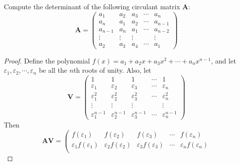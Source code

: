 \documentclass[12pt, a4paper, oneside]{book}
\begin{document}
\begin{question}
    Compute the determinant of the following circulant matrix $\mathbf{A}$:
    \[
        \mathbf{A}
        =
        \left(\begin{array}{ccccc}
                a_1     & a_2    & a_3    & \cdots & a_n     \\
                a_n     & a_1    & a_2    & \cdots & a_{n-1} \\
                a_{n-1} & a_n    & a_1    & \cdots & a_{n-2} \\
                \vdots  & \vdots & \vdots &        & \vdots  \\
                a_2     & a_3    & a_4    & \cdots & a_1
            \end{array}\right)
    \]
    \begin{proof}
        Define the polynomial $f(x)=a_1+a_2 x+a_3 x^2+\cdots+a_n x^{n-1}$, and let $\varepsilon_1, \varepsilon_2, \cdots, \varepsilon_n$ be all the $n$th roots of unity. Also, let
        \[
            \mathbf{V}
            =
            \left(\begin{array}{ccccc}
                    1                   & 1                   & 1                   & \cdots & 1                   \\
                    \varepsilon_1       & \varepsilon_2       & \varepsilon_3       & \cdots & \varepsilon_n       \\
                    \varepsilon_1^2     & \varepsilon_2^2     & \varepsilon_3^2     & \cdots & \varepsilon_n^2     \\
                    \vdots              & \vdots              & \vdots              &        & \vdots              \\
                    \varepsilon_1^{n-1} & \varepsilon_2^{n-1} & \varepsilon_3^{n-1} & \cdots & \varepsilon_n^{n-1}
                \end{array}
            \right)
        \]
        Then
        \[
            \mathbf{A} \mathbf{V}
            =
            \left(\begin{array}{ccccc}
                    f\left(\varepsilon_1\right)                     & f\left(\varepsilon_2\right)                     & f\left(\varepsilon_3\right)                     & \cdots & f\left(\varepsilon_n\right)                     \\
                    \varepsilon_1 f\left(\varepsilon_1\right)       & \varepsilon_2 f\left(\varepsilon_2\right)       & \varepsilon_3 f\left(\varepsilon_3\right)       & \cdots & \varepsilon_n f\left(\varepsilon_n\right)       \\

\end{array}\]
\end{proof}
\end{question}
\end{document}
